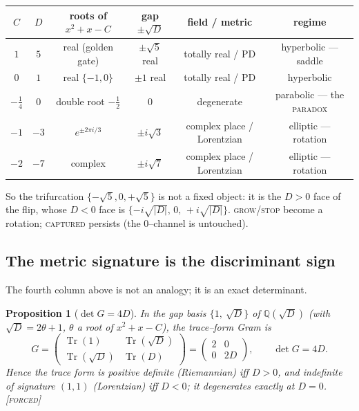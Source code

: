 \documentclass[11pt]{article}
\theoremstyle{plain}
\newtheorem{proposition}[theorem]{Proposition}
\theoremstyle{definition}
\theoremstyle{remark}
\newcommand{\forced}{\textcolor{forcedc}{\textsc{[forced]}}}
\newcommand{\Q}{\mathbb{Q}}
\newcommand{\tr}{\operatorname{Tr}}
\newcommand{\abs}[1]{\left\lvert #1 \right\rvert}
\begin{document}
\begin{center}
\renewcommand{\arraystretch}{1.4}
\begin{tabular}{@{}cccccc@{}}
\toprule
$C$ & $D$ & roots of $x^2+x-C$ & gap $\pm\sqrt D$ & field / metric & regime \\
\midrule
$1$ & $5$ & real (golden gate) & $\pm\sqrt5$ real & totally real / PD & hyperbolic --- saddle \\
$0$ & $1$ & real $\{-1,0\}$ & $\pm1$ real & totally real / PD & hyperbolic \\
$-\tfrac14$ & $0$ & double root $-\tfrac12$ & $0$ & degenerate & parabolic --- the \textsc{paradox} \\
$-1$ & $-3$ & $e^{\pm 2\pi i/3}$ & $\pm i\sqrt3$ & complex place / Lorentzian & elliptic --- rotation \\
$-2$ & $-7$ & complex & $\pm i\sqrt7$ & complex place / Lorentzian & elliptic --- rotation \\
\bottomrule
\end{tabular}
\end{center}

\noindent So the trifurcation $\{-\sqrt5,0,+\sqrt5\}$ is not a fixed object: it is the $D>0$ face of the flip, whose $D<0$ face is $\{-i\sqrt{\abs D},\,0,\,+i\sqrt{\abs D}\}$. \textsc{grow}/\textsc{stop} become a rotation; \textsc{captured} persists (the $0$--channel is untouched).

\subsection{The metric signature is the discriminant sign}

The fourth column above is not an analogy; it is an exact determinant.

\begin{proposition}[$\det G = 4D$]\label{prop:detG}
In the gap basis $\{1,\ \sqrt D\}$ of $\Q(\sqrt D)$ (with $\sqrt D = 2\theta+1$, $\theta$ a root of $x^2+x-C$), the trace--form Gram is
\begin{equation}\label{eq:detG}
G = \begin{pmatrix} \tr(1) & \tr(\sqrt D)\\ \tr(\sqrt D) & \tr(D) \end{pmatrix} = \begin{pmatrix} 2 & 0\\ 0 & 2D \end{pmatrix}, \qquad \det G = 4D .
\end{equation}
Hence the trace form is positive definite (Riemannian) iff $D>0$, and indefinite of signature $(1,1)$ (Lorentzian) iff $D<0$; it degenerates exactly at $D=0$. \forced
\end{proposition}
\end{document}
